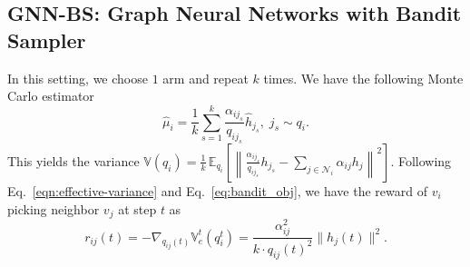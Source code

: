 \documentclass{article}
\begin{document}
\subsection{GNN-BS: Graph Neural Networks with Bandit Sampler}\label{sec:bs}


In this setting, we choose $1$ arm and 
repeat $k$ times. We have the
following Monte Carlo estimator 
\begin{equation}\label{eq:estimator1}
\hat{\mu}_i = 
\frac{1}{k}\sum_{s=1}^{k}\frac{\alpha_{ij_s}}{q_{ij_s}}\hat{h}_{j_s}, \; j_s \sim q_{i}.
\end{equation}
This yields the variance
$
\mathbb{V}(q_i) = \frac{1}{k}\,\mathbb{E}_{q_i}\left[\left\|\frac{\alpha_{ij_s}}{q_{ij_s}}h_{j_s} - \sum_{j\in \mathcal{N}_i}\alpha_{ij}h_j\right\|^{2}\right].
$
Following Eq.~\eqref{eqn:effective-variance} and Eq.~\eqref{eq:bandit_obj}, 
we have the reward of $v_i$ picking neighbor $v_j$ at step $t$ as 
\begin{equation}\label{eq:reward1}
r_{ij}(t)=-\nabla_{q_{ij}(t)}\mathbb{V}_e^t(q_i^t)
=\frac{\alpha_{ij}^2}{k\cdot q_{ij}(t)^2}\|h_j(t)\|^2.
\end{equation}


\begin{comment}
We describe our training algorithm in Algorithm~\ref{alg:train_gnn}.
At each iteration $t$, we read a minibatch of labeled vertices.
We randomly sample the layers in a top-down manner by using our
maintained sampling distribution $q_i^t$'s. 
We do feedward by using our Monte Carlo estimator~\eqref{eq:estimator1}.
After we update the GNN model, 
we collect rewards defined in Eq.~\eqref{eq:reward1}, 
and update the sampling distribution $q_i$'s 
using \textbf{EXP3}~\cite{auer2002nonstochastic}, which 
is a simple adversary MAB algorithm.
The parameter $\eta$ in EXP3 controls how fast the 
sampling distribution $q_i$ deviates from the uniform,
and $\delta$ controls how fast the probability mass 
on a single location can change.
\end{comment}

\begin{comment}
\begin{algorithm}
\caption{DepRound$(k,(q_{1},q_{2},...,q_{K}))$}
\label{alg:dep_round}
\begin{algorithmic}[1]
\State \textbf{Input:} Sample size $k(k<K)$, sample distribution $(q_1,q_2,...,q_K)$ with $\sum_{i=1}^{K}q_i=k$
\State \textbf{Output:} Subset of $[K]$ with $k$ elements
\While{there is an $i$ with $0<q_i<1$}
    \State Choose distinct $i$ and $j$ with $0<q_i<1$ and $0<q_j<1$
    \State Set $\beta=\min\{1-q_i, q_j\}$ and $\gamma=\min\{q_i,1-q_j\}$ 
    \State Update $q_i$ and $q_j$ as
    $$
    (q_i,q_j)=\begin{cases}
		(q_i+\beta,q_j-\beta)\; \text{with probability}\; \frac{\gamma}{\beta+\gamma} \\
		(q_i-\gamma,q_j+\gamma)\; \text{with probability}\; \frac{\beta}{\beta+\gamma}
	\end{cases}
    $$
\EndWhile
\State \textbf{return} $\{i:q_i=1,1\leq i\leq K\}$
\end{algorithmic}
\end{algorithm}
\end{comment}
\end{document}
